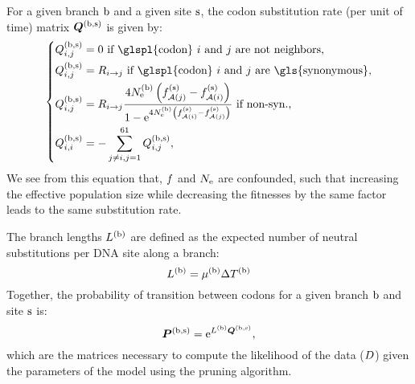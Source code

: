 For a given branch $\text{b}$ and a given site $\text{s}$, the \gls{codon} \gls{substitution} rate (per unit of time) matrix $\bm{Q}^{(\text{b}, \text{s})}$ is given by:
\begin{equation}
    \label{eq:subrates}
    \begin{dcases}
        \submatrix\branchsiteexp_{\itoj} = 0\text{ if \glspl{codon} $\ci$ and $\cj$ are not neighbors,} \\
        \submatrix\branchsiteexp_{\itoj} = \mutmatrix_{\nucitoj}\text{ if \glspl{codon} $\ci$ and $\cj$ are \gls{synonymous},} \\
        \submatrix\branchsiteexp_{\itoj} = \mutmatrix_{\nucitoj} \dfrac{4\Ne\branchexp \left({\fitj\siteexp - \fiti\siteexp}\right)}{{1 - \e^{4\Ne\branchexp\left({\fiti\siteexp - \fitj\siteexp}\right)} }} \text{ if non-syn.,}\\
        \submatrix\branchsiteexp_{\ci, \ci} = - \sum\limits_{ \cj \neq \ci, \cj=1}^{61} \submatrix\branchsiteexp_{\itoj},
    \end{dcases}
\end{equation}
We see from this equation that, $f$ and $N_{\text{e}}$ are confounded, such that increasing the \gls{effective population size} while decreasing the fitnesses by the same factor leads to the same \gls{substitution} rate.

The branch lengths $L^{(\text{b})}$ are defined as the expected number of \gls{neutral} \glspl{substitution} per \acrshort{DNA} site along a branch:
\begin{equation}
    \label{eq:branchlength}
    \branchlength\branchexp = \mu\branchexp \branchtime\branchexp
\end{equation}
Together, the probability of transition between \glspl{codon} for a given branch $\text{b}$ and site $\text{s}$ is:
\begin{equation}
    \label{eq:Probmatrix}
    \Probmatrix\branchsiteexp = \e^{\branchlength\branchexp \Submatrix\branchsiteexp},
\end{equation}
which are the matrices necessary to compute the \gls{likelihood} of the data ($D$) given the parameters of the model using the pruning algorithm.

